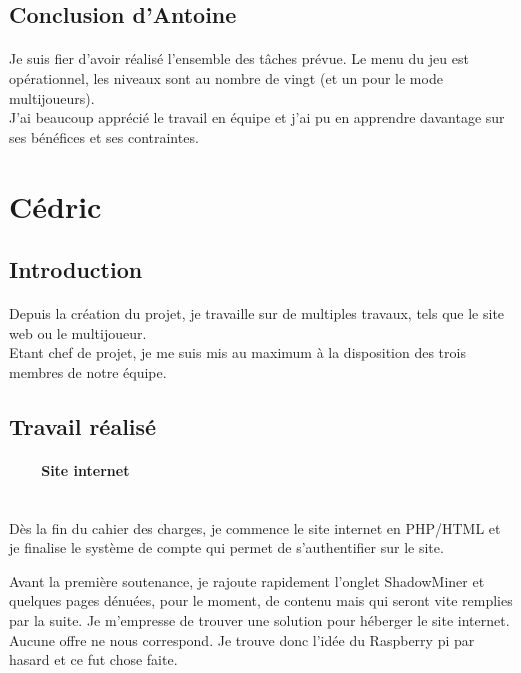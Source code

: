 \documentclass[titlepage, 13px, a4paper]{report}
\begin{document}
\subsection{Conclusion d'Antoine}
\paragraph*{} \hspace{0pt}
Je suis fier d’avoir réalisé l’ensemble des tâches prévue. 
Le menu du jeu est opérationnel, les niveaux
sont au nombre de vingt (et un pour le mode multijoueurs). \\
J'ai beaucoup apprécié le travail en équipe et j'ai pu en 
apprendre davantage sur ses bénéfices et ses contraintes. \\


\newpage
\section{Cédric}
\subsection{Introduction}
\paragraph*{} \hspace{0pt}
Depuis la création du projet, je travaille sur de multiples travaux, tels que le site web ou le multijoueur. \\
Etant chef de projet, je me suis mis au maximum à la disposition des trois membres de notre équipe. \\


\subsection{Travail réalisé}
\paragraph{~~~~Site internet} \hspace{0pt} \\
Dès la fin du cahier des charges, je commence le site internet en PHP/HTML et je finalise le système de 
compte qui permet de s’authentifier sur le site.

Avant la première soutenance, je rajoute rapidement l’onglet ShadowMiner et quelques pages dénuées, pour 
le moment, de contenu mais qui seront vite remplies par la suite. Je m’empresse de trouver une solution pour héberger le 
site internet. Aucune offre ne nous correspond. Je trouve donc l’idée du Raspberry pi par hasard et ce fut chose faite.
\end{document}
